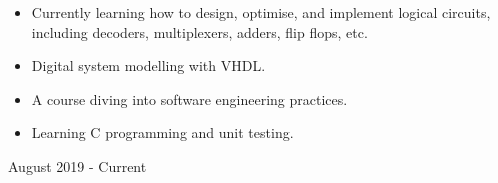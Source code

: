 






\begin{itemize}
\item Currently learning how to design, optimise, and implement logical circuits, including decoders, multiplexers, adders, flip flops, etc.
\item Digital system modelling with VHDL.
\end{itemize}
\smallskip
\smallskip
{}
\begin{itemize}
\item A course diving into software engineering practices.
\item Learning C programming and unit testing.
\end{itemize}


\medskip
{}
\medskip
{}


August 2019 - Current
\\ \medskip
\medskip
{}